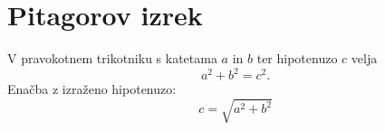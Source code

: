\documentclass{article}
\begin{document}
\section*{Pitagorov izrek}
V pravokotnem trikotniku s katetama \(a\) in \(b\) ter hipotenuzo \(c\) velja
\[ a^2 + b^2 = c^2 .\]
Enačba z izraženo hipotenuzo:
\[c = \sqrt{a^2 + b^2}\]
\end{document}
